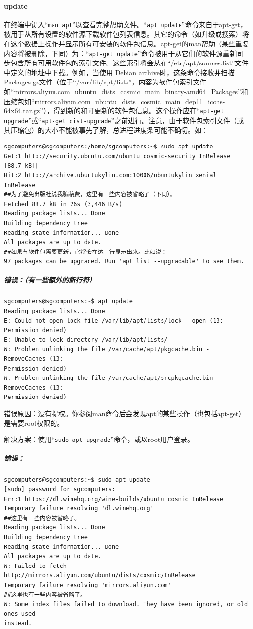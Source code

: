 \paragraph{update} 
在终端中键入“\verb|man apt|”以查看完整帮助文件。“\verb|apt update|”命令来自于apt-get，被用于从所有设置的软件源下载软件包列表信息。其它的命令（如升级或搜索）将在这个数据上操作并显示所有可安装的软件包信息。apt-get的man帮助（某些重复内容将被删除，下同）为：“\verb|apt-get update|”命令被用于从它们的软件源重新同步包含所有可用软件包的索引文件。这些索引将会从在“/etc/apt/sources.list”文件中定义的地址中下载。例如，当使用 Debian archive时，这条命令接收并扫描Packages.gz文件（位于“/var/lib/apt/lists”，内容为软件包索引文件如“mirrors.aliyun.com\_ubuntu\_dists\_cosmic\_main\_binary-amd64\_Packages”和压缩包如“mirrors.aliyun.com\_ubuntu\_dists\_cosmic\_main\_dep11\_icons-64x64.tar.gz”），得到新的和可更新的软件包信息。这个操作应在“\verb|apt-get upgrade|”或“\verb|apt-get dist-upgrade|”之前进行。注意，由于软件包索引文件（或其压缩包）的大小不能被事先了解，总进程进度条可能不确切。如：
\begin{verbatim}
sgcomputers@sgcomputers:/home/sgcomputers:~$ sudo apt update
Get:1 http://security.ubuntu.com/ubuntu cosmic-security InRelease [88.7 kB]|
Hit:2 http://archive.ubuntukylin.com:10006/ubuntukylin xenial InRelease
##为了避免出版社说我骗稿费，这里有一些内容被省略了（下同）。
Fetched 88.7 kB in 26s (3,446 B/s)
Reading package lists... Done
Building dependency tree
Reading state information... Done
All packages are up to date.
##如果有软件包需要更新，它将会在这一行显示出来。比如说：
97 packages can be upgraded. Run 'apt list --upgradable' to see them.
\end{verbatim}
\subparagraph{错误：（有一些额外的断行符）}
\begin{verbatim}
sgcomputers@sgcomputers:~$ apt update
Reading package lists... Done
E: Could not open lock file /var/lib/apt/lists/lock - open (13: Permission denied)
E: Unable to lock directory /var/lib/apt/lists/
W: Problem unlinking the file /var/cache/apt/pkgcache.bin - RemoveCaches (13:
Permission denied)
W: Problem unlinking the file /var/cache/apt/srcpkgcache.bin - RemoveCaches (13:
Permission denied)
\end{verbatim} \par
错误原因：没有提权。你参阅man命令后会发现apt的某些操作（也包括apt-get）是需要root权限的。  \par
解决方案：使用“\verb|sudo apt upgrade|”命令，或以root用户登录。  \par
\subparagraph{错误：}
\begin{verbatim}
sgcomputers@sgcomputers:~$ sudo apt update
[sudo] password for sgcomputers:
Err:1 https://dl.winehq.org/wine-builds/ubuntu cosmic InRelease
Temporary failure resolving 'dl.winehq.org'
##这里有一些内容被省略了。
Reading package lists... Done
Building dependency tree
Reading state information... Done
All packages are up to date.
W: Failed to fetch http://mirrors.aliyun.com/ubuntu/dists/cosmic/InRelease
Temporary failure resolving 'mirrors.aliyun.com'
##这里也有一些内容被省略了。
W: Some index files failed to download. They have been ignored, or old ones used
instead.
\end{verbatim} \par
